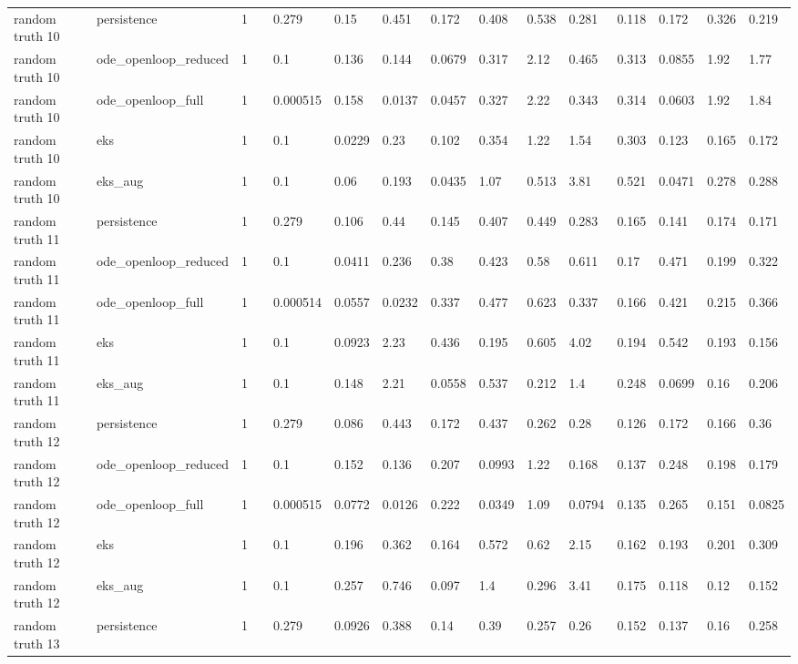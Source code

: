 \begin{table}[t]
\begin{tabular}{lllllllllllllll}
random truth 10 & persistence & 1 &  & 0.279 & 0.15 & 0.451 & 0.172 & 0.408 & 0.538 & 0.281 & 0.118 & 0.172 & 0.326 & 0.219 \\
random truth 10 & ode\_openloop\_reduced & 1 &  & 0.1 & 0.136 & 0.144 & 0.0679 & 0.317 & 2.12 & 0.465 & 0.313 & 0.0855 & 1.92 & 1.77 \\
random truth 10 & ode\_openloop\_full & 1 &  & 0.000515 & 0.158 & 0.0137 & 0.0457 & 0.327 & 2.22 & 0.343 & 0.314 & 0.0603 & 1.92 & 1.84 \\
random truth 10 & eks & 1 &  & 0.1 & 0.0229 & 0.23 & 0.102 & 0.354 & 1.22 & 1.54 & 0.303 & 0.123 & 0.165 & 0.172 \\
random truth 10 & eks\_aug & 1 &  & 0.1 & 0.06 & 0.193 & 0.0435 & 1.07 & 0.513 & 3.81 & 0.521 & 0.0471 & 0.278 & 0.288 \\
random truth 11 & persistence & 1 &  & 0.279 & 0.106 & 0.44 & 0.145 & 0.407 & 0.449 & 0.283 & 0.165 & 0.141 & 0.174 & 0.171 \\
random truth 11 & ode\_openloop\_reduced & 1 &  & 0.1 & 0.0411 & 0.236 & 0.38 & 0.423 & 0.58 & 0.611 & 0.17 & 0.471 & 0.199 & 0.322 \\
random truth 11 & ode\_openloop\_full & 1 &  & 0.000514 & 0.0557 & 0.0232 & 0.337 & 0.477 & 0.623 & 0.337 & 0.166 & 0.421 & 0.215 & 0.366 \\
random truth 11 & eks & 1 &  & 0.1 & 0.0923 & 2.23 & 0.436 & 0.195 & 0.605 & 4.02 & 0.194 & 0.542 & 0.193 & 0.156 \\
random truth 11 & eks\_aug & 1 &  & 0.1 & 0.148 & 2.21 & 0.0558 & 0.537 & 0.212 & 1.4 & 0.248 & 0.0699 & 0.16 & 0.206 \\
random truth 12 & persistence & 1 &  & 0.279 & 0.086 & 0.443 & 0.172 & 0.437 & 0.262 & 0.28 & 0.126 & 0.172 & 0.166 & 0.36 \\
random truth 12 & ode\_openloop\_reduced & 1 &  & 0.1 & 0.152 & 0.136 & 0.207 & 0.0993 & 1.22 & 0.168 & 0.137 & 0.248 & 0.198 & 0.179 \\
random truth 12 & ode\_openloop\_full & 1 &  & 0.000515 & 0.0772 & 0.0126 & 0.222 & 0.0349 & 1.09 & 0.0794 & 0.135 & 0.265 & 0.151 & 0.0825 \\
random truth 12 & eks & 1 &  & 0.1 & 0.196 & 0.362 & 0.164 & 0.572 & 0.62 & 2.15 & 0.162 & 0.193 & 0.201 & 0.309 \\
random truth 12 & eks\_aug & 1 &  & 0.1 & 0.257 & 0.746 & 0.097 & 1.4 & 0.296 & 3.41 & 0.175 & 0.118 & 0.12 & 0.152 \\
random truth 13 & persistence & 1 &  & 0.279 & 0.0926 & 0.388 & 0.14 & 0.39 & 0.257 & 0.26 & 0.152 & 0.137 & 0.16 & 0.258 \\

\end{tabular}
\end{table}

